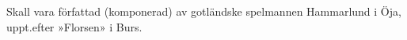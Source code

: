 Skall vara författad (komponerad) av gotländske spelmannen Hammarlund i Öja,
uppt.\@ efter »Florsen» i Burs.